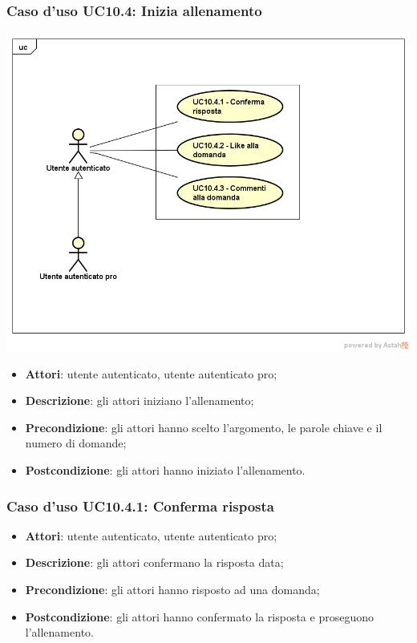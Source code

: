 \subsubsection{Caso d'uso UC10.4: Inizia allenamento}
\begin{center}
	\includegraphics[scale=0.5]{UML/UC10_4.png}
\end{center}
	\begin{itemize}
		\item \textbf{Attori}: utente autenticato, utente autenticato pro;
		\item \textbf{Descrizione}: gli attori iniziano l'allenamento;
		\item \textbf{Precondizione}: gli attori hanno scelto l'argomento, le parole chiave e il numero di domande;
		\item \textbf{Postcondizione}: gli attori hanno iniziato l'allenamento.
	\end{itemize}
\subsubsection{Caso d'uso UC10.4.1: Conferma risposta}
	\begin{itemize}
		\item \textbf{Attori}: utente autenticato, utente autenticato pro;
		\item \textbf{Descrizione}: gli attori confermano la risposta data;
		\item \textbf{Precondizione}: gli attori hanno risposto ad una domanda;
		\item \textbf{Postcondizione}: gli attori hanno confermato la risposta e proseguono l'allenamento.
	\end{itemize}
